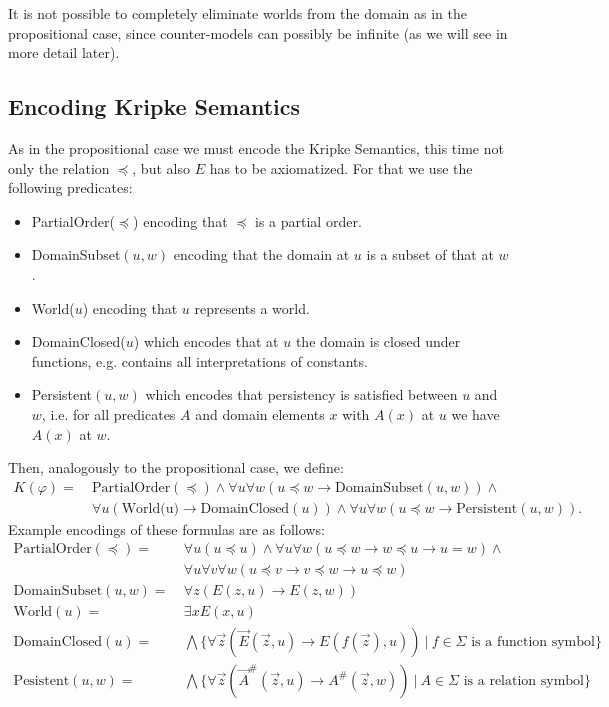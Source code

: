 \documentclass[a4paper,11pt]{report}
\theoremstyle{definition}
\theoremstyle{definition}
\theoremstyle{definition}
\theoremstyle{definition}
\theoremstyle{definition}
\theoremstyle{definition}
\theoremstyle{definition}
\begin{document}
	It is not possible to completely eliminate worlds from the domain as in the propositional case, since counter-models can possibly be infinite (as we will see in more detail later).

	
	\subsection{Encoding Kripke Semantics}
	
	As in the propositional case we must encode the Kripke Semantics, this time not only the relation $\preceq$, but also $E$ has to be axiomatized. For that we use the following predicates:
	\begin{itemize}
		\item PartialOrder($\preceq$) encoding that $\preceq$ is a partial order.
		\item DomainSubset$(u, w)$ encoding that the domain at $u$ is a subset of that at $w$.
		\item World($u$) encoding that $u$ represents a world.
		\item DomainClosed($u$) which encodes that at $u$ the domain is closed under functions, e.g. contains all interpretations of constants.
		\item Persistent$(u, w)$ which encodes that persistency is satisfied between $u$ and $w$, i.e. for all predicates $A$ and domain elements $x$ with $A(x)$ at $u$ we have $A(x)$ at $w$.
	\end{itemize}
	Then, analogously to the propositional case, we define:
	\begin{align*}
		K(\varphi) = \:& \text{PartialOrder}(\preceq) \wedge \forall u \forall w (u\preceq w\to \text{DomainSubset}(u, w)) \wedge\\
		& \forall u(\text{World(u)}\to \text{DomainClosed}(u))\wedge \forall u\forall w (u\preceq w\to \text{Persistent}(u, w)).
	\end{align*}
	Example encodings of these formulas are as follows:
	\begin{align*}
		\text{PartialOrder}(\preceq) = &\:\forall u(u\preceq u)\wedge\forall u\forall w(u\preceq w\to w\preceq u\to u = w)\wedge\\&\:\forall u\forall v\forall w(u\preceq v\to v\preceq w\to u\preceq w)\\
		\text{DomainSubset}(u, w) = &\:\forall z(E(z, u)\to E(z, w))\\
		\text{World}(u) = &\:\exists xE(x, u)\\
		\text{DomainClosed}(u) = &\:\bigwedge\{\forall\vec z(\vec E(\vec z, u)\to E(f(\vec z), u))\:|\:\text{$f\in\Sigma$ is a function symbol}\}\\
		\text{Pesistent}(u, w) = &\:\bigwedge\{\forall\vec z(\vec A^\#(\vec z, u)\to A^\#(\vec z, w))\:|\:\text{$A\in\Sigma$ is a relation symbol}\}
	\end{align*}
	
\end{document}
